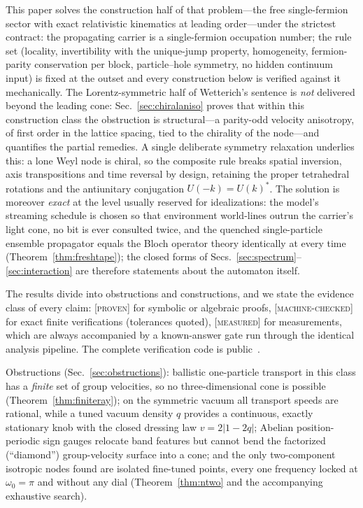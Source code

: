 \documentclass[aps,prd,twocolumn,superscriptaddress,nofootinbib,floatfix]{revtex4-2}
\newcommand{\evP}{\textnormal{\textsc{[proven]}}}
\newcommand{\evM}{\textnormal{\textsc{[machine-checked]}}}
\newcommand{\evX}{\textnormal{\textsc{[measured]}}}
\begin{document}
This paper solves the construction half of that problem---the free
single-fermion sector with exact relativistic kinematics at leading
order---under the strictest contract: the propagating carrier is a
single-fermion occupation number; the rule set (locality, invertibility
with the unique-jump property, homogeneity, fermion-parity conservation
per block, particle--hole symmetry, no hidden continuum input) is fixed
at the outset and every construction below is verified against it
mechanically. The Lorentz-symmetric half of Wetterich's sentence is
\emph{not} delivered beyond the leading cone: Sec.~\ref{sec:chiralaniso}
proves that within this construction class the obstruction is
structural---a parity-odd velocity anisotropy, of first order in the
lattice spacing, tied to the chirality of the node---and quantifies the
partial remedies. A single deliberate symmetry relaxation underlies
this: a lone Weyl node is chiral, so the composite rule breaks spatial
inversion, axis transpositions and time reversal by design, retaining
the proper tetrahedral rotations and the antiunitary conjugation
$U(-k)=U(k)^*$. The
solution is moreover \emph{exact} at the level usually reserved for
idealizations: the model's streaming schedule is chosen so that
environment world-lines outrun the carrier's light cone, no bit is ever
consulted twice, and the quenched single-particle ensemble propagator
equals the Bloch operator theory identically at every time
(Theorem~\ref{thm:freshtape}); the closed forms of
Secs.~\ref{sec:spectrum}--\ref{sec:interaction} are therefore statements
about the automaton itself.

The results divide into obstructions and constructions, and we state the
evidence class of every claim: \evP{} for symbolic or algebraic proofs,
\evM{} for exact finite verifications (tolerances quoted), \evX{} for
measurements, which are always accompanied by a known-answer gate run
through the identical analysis pipeline. The complete verification code is
public~\cite{repo}.

Obstructions (Sec.~\ref{sec:obstructions}): ballistic one-particle
transport in this class has a \emph{finite} set of group velocities, so no
three-dimensional cone is possible (Theorem~\ref{thm:finiteray}); on the
symmetric vacuum all transport speeds are rational, while a tuned vacuum
density $q$ provides a continuous, exactly stationary knob with the closed
dressing law $v=2|1-2q|$; Abelian position-periodic sign gauges relocate
band features but cannot bend the factorized (``diamond'') group-velocity
surface into a cone; and the only two-component isotropic nodes found
are isolated fine-tuned points, every one frequency locked at
$\omega_0=\pi$ and without any dial (Theorem~\ref{thm:ntwo} and the
accompanying exhaustive search).
\end{document}
